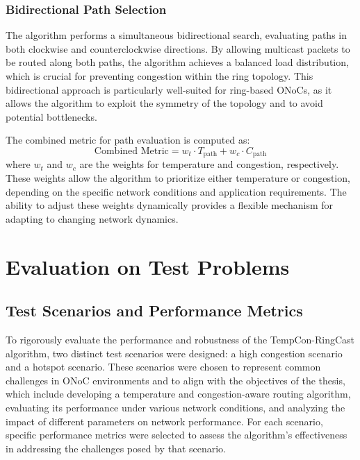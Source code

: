 \documentclass[12pt]{article}
\begin{document}
\subsection{Bidirectional Path Selection}
The algorithm performs a simultaneous bidirectional search, evaluating paths in both clockwise and counterclockwise directions. By allowing multicast packets to be routed along both paths, the algorithm achieves a balanced load distribution, which is crucial for preventing congestion within the ring topology. This bidirectional approach is particularly well-suited for ring-based ONoCs, as it allows the algorithm to exploit the symmetry of the topology and to avoid potential bottlenecks.

The combined metric for path evaluation is computed as:
\begin{equation}
    \text{Combined Metric} = w_t \cdot T_{\text{path}} + w_c \cdot C_{\text{path}}
\end{equation}
where \(w_t\) and \(w_c\) are the weights for temperature and congestion, respectively. These weights allow the algorithm to prioritize either temperature or congestion, depending on the specific network conditions and application requirements. The ability to adjust these weights dynamically provides a flexible mechanism for adapting to changing network dynamics.

\newpage

\chapter{Evaluation on Test Problems}

\section{Test Scenarios and Performance Metrics}
To rigorously evaluate the performance and robustness of the TempCon-RingCast algorithm, two distinct test scenarios were designed: a high congestion scenario and a hotspot scenario. These scenarios were chosen to represent common challenges in ONoC environments and to align with the objectives of the thesis, which include developing a temperature and congestion-aware routing algorithm, evaluating its performance under various network conditions, and analyzing the impact of different parameters on network performance. For each scenario, specific performance metrics were selected to assess the algorithm's effectiveness in addressing the challenges posed by that scenario.
\end{document}
